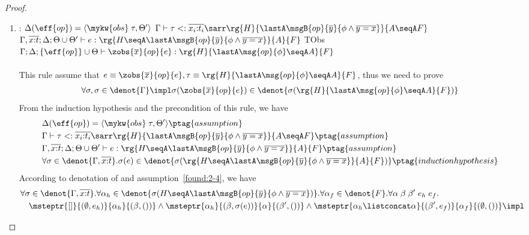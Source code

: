 \begin{proof}
\begin{enumerate}[label=Case]
\item:
{\footnotesize
\mprooftr{80mm}
{
  $\Delta(\eff{op}) =\langle \mykw{obs}\;\tau, \Theta'\rangle$ \quad
$\Gamma \vdash \tau <: \overline{x_i{:}t_i}\sarr
\rg{H}{\lastA\msgB{op}{\overline{y}}{\phi \land \overline{y = x}}}{A \seqA F}$ \quad
 $\Gamma, \overline{x{:}t}; \Delta; \Theta \cup \Theta' \vdash e : \rg{H \seqA \lastA\msgB{op}{\overline{y}}{\phi \land \overline{y = x}}}{A}{F}$
 }
{TObs}
{$\Gamma; \Delta; \{\eff{op}\} \cup \Theta \vdash \zobs{\overline{x}}{op}{e} : \rg{H}{\lastA\msg{op}{\phi}\seqA A}{F}$}
\ \\ \ \\}
This rule assume that $e \equiv \zobs{\overline{x}}{op}{e}, \tau \equiv\rg{H}{\lastA\msg{op}{\phi} \seqA A}{F}$, thus we need to prove
{\footnotesize\begin{align*}
    \forall \sigma, \sigma \in \denot{\Gamma} \impl \sigma(\zobs{\overline{x}}{op}{e}) \in \denot{\sigma(\rg{H}{\lastA\msg{op}{\phi} \seqA A}{F})}
\end{align*}}\noindent
From the induction hypothesis and the precondition of this rule, we have
{\footnotesize\begin{alignat}{2}
\setcounter{equation}{0}
&\Delta(\eff{op}) =\langle \mykw{obs}\;\tau, \Theta' \rangle \ptag{assumption} \label{found:2-1} \\
&\Gamma \vdash \tau <: \overline{x_i{:}t_i}\sarr\rg{H}{\lastA\msgB{op}{\overline{y}}{\phi \land \overline{y = x}}}{A \seqA F} \ptag{assumption} \label{found:2-2} \\
&\Gamma, \overline{x{:}t}; \Delta; \Theta \cup \Theta' \vdash e : \rg{H \seqA \lastA\msgB{op}{\overline{y}}{\phi \land \overline{y = x}}}{A}{F} \ptag{assumption} \label{found:2-3} \\
&\forall \sigma \in \denot{\Gamma, \overline{x{:}t}}. \sigma(e) \in \denot{\sigma(\rg{H \seqA \lastA\msgB{op}{\overline{y}}{\phi \land \overline{y = x}}}{A}{F})} \ptag{induction hypothesis} \label{found:2-4}
\end{alignat}}\noindent
According to denotation of \PAT and assumption~\ref{found:2-4}, we have
{\footnotesize\begin{alignat}{2}
&\forall \sigma \in\denot{\Gamma, \overline{x{:}t}}. \forall \alpha_h \in\denot{\sigma(H \seqA \lastA\msgB{op}{\overline{y}}{\phi \land \overline{y = x}})}.\forall \alpha_f \in\denot{F}. \forall \alpha\;\beta\;\beta'\;e_h\;e_f. \notag 
\\&\quad \msteptr{[]}{(\emptyset, e_h)}{\alpha_h}{(\beta, ())} \land \msteptr{\alpha_h}{(\beta, \sigma(e))}{\alpha}{(\beta', ())} \land \msteptr{\alpha_h \listconcat \alpha }{(\beta', e_f)}{\alpha_f}{(\emptyset, ())} \impl \notag 

\end{alignat}}
\end{enumerate}
\end{proof}
